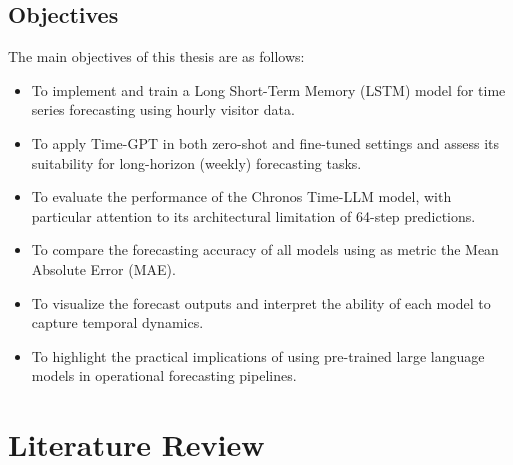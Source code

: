 \documentclass{article}
\begin{document}
\subsection{Objectives}
The main objectives of this thesis are as follows:

\begin{itemize}
    \item To implement and train a Long Short-Term Memory (LSTM) model for time series forecasting using hourly visitor data.
\end{itemize}

\begin{itemize}
    \item To apply Time-GPT in both zero-shot and fine-tuned settings and assess its suitability for long-horizon (weekly) forecasting tasks.
\end{itemize}

\begin{itemize}
    \item To evaluate the performance of the Chronos Time-LLM model, with particular attention to its architectural limitation of 64-step predictions.
\end{itemize}

\begin{itemize}
    \item To compare the forecasting accuracy of all models using as metric the Mean Absolute Error (MAE).
\end{itemize}

\begin{itemize}
    \item To visualize the forecast outputs and interpret the ability of each model to capture temporal dynamics.
\end{itemize}

\begin{itemize}
    \item To highlight the practical implications of using pre-trained large language models in operational forecasting pipelines.
\end{itemize}


\newpage
\section{Literature Review}
\end{document}
